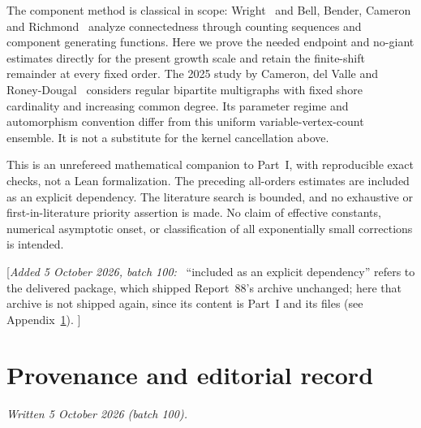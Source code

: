 \documentclass[11pt,a4paper]{article}
\theoremstyle{remark}\newtheorem{remark}[theorem]{Remark}%
\newenvironment{writenote}{\par\smallskip\noindent\small[\textit{Added 5 October 2026, batch 100:}\ }{]\par\smallskip}
\begin{document}
The component method is classical in scope: Wright~\cite{Wright} and Bell, Bender, Cameron and Richmond~\cite{BBCR} analyze connectedness through counting sequences and component generating functions. Here we prove the needed endpoint and no-giant estimates directly for the present growth scale and retain the finite-shift remainder at every fixed order. The 2025 study by Cameron, del Valle and Roney-Dougal~\cite{Regular} considers regular bipartite multigraphs with fixed shore cardinality and increasing common degree. Its parameter regime and automorphism convention differ from this uniform variable-vertex-count ensemble. It is not a substitute for the kernel cancellation above.

This is an unrefereed mathematical companion to Part~I, with reproducible exact checks, not a Lean formalization. The preceding all-orders estimates are included as an explicit dependency. The literature search is bounded, and no exhaustive or first-in-literature priority assertion is made. No claim of effective constants, numerical asymptotic onset, or classification of all exponentially small corrections is intended.

\begin{writenote}
``included as an explicit dependency'' refers to the delivered package,
which shipped Report~88's archive unchanged; here that archive is not
shipped again, since its content is Part~I and its files (see
Appendix~\ref{bpm:app:provenance}).
\end{writenote}

\appendix
\section{Provenance and editorial record}\label{bpm:app:provenance}
\textit{Written 5 October 2026 (batch 100).}
\end{document}
